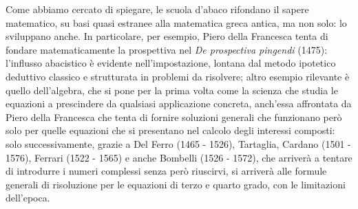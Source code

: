 \par Come abbiamo cercato di spiegare, le scuola d'abaco rifondano il sapere matematico, su basi quasi estranee alla matematica greca antica, ma non solo: lo sviluppano anche. In particolare, per esempio, Piero della Francesca tenta di fondare matematicamente la prospettiva nel \textit{De prospectiva pingendi} (1475): l'influsso abacistico \`e evidente nell'impostazione, lontana dal metodo ipotetico deduttivo classico e strutturata in problemi da risolvere; altro esempio rilevante \`e quello dell'algebra, che si pone per la prima volta come la scienza che studia le equazioni a prescindere da qualsiasi applicazione concreta, anch'essa affrontata da Piero della Francesca che tenta di fornire soluzioni generali che funzionano per\`o solo per quelle equazioni che si presentano nel calcolo degli interessi composti: solo successivamente, grazie a Del Ferro (1465 - 1526), Tartaglia, Cardano (1501 - 1576), Ferrari (1522 - 1565) e anche Bombelli (1526 - 1572), che arriver\`a a tentare di introdurre i numeri complessi senza per\`o riuscirvi, si arriver\`a alle formule generali di risoluzione per le equazioni di terzo e quarto grado, con le limitazioni dell'epoca.
